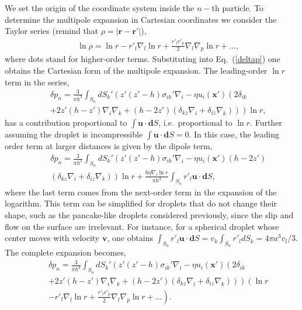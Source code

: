We set the origin of the coordinate system
inside the $n-$th particle. To determine the multipole expansion in Cartesian coordinates we consider the Taylor series (remind that $\rho=|\bm r-\bm r'|$),
\begin{eqnarray}&&\!\!\!\!\!\!
\ln \rho\!=\!\ln r\!-\!r'_l\nabla_l\ln r\!+\!\frac{r'_lr'_p}{2}\nabla_l\nabla_p\ln r\!+\!\ldots,
\end{eqnarray}
where dots stand for higher-order terms. Substituting into Eq.~(\ref{deltap}) one obtains the Cartesian form of the multipole expansion. The  leading-order $\ln r$ term in the series,
\begin{eqnarray}&&\!\!\!\!\!\!
\delta p_n=\frac{3}{\pi h^3}\int_{S_n}dS_k' \left(
z'(z'-h) \sigma_{ik}'\nabla_i-\eta u_{i}(\bm x')\left(
2\delta_{ik}\nonumber\right.\right.\\&&\!\!\!\!\!\!\left.\left.+2z'(h\!-\!z')\nabla_i \nabla_k
+(h\!-\!2z')
\left(\delta_{kz}\nabla_i+\delta_{iz}\nabla_k \right)\right)\right)\ln r,
\end{eqnarray}
has a contribution proportional to $\int \bm u\cdot{\bm dS}$, i.e.\  proportional to $\ln r$. Further assuming the droplet is incompressible $\int \bm u\cdot{\bm dS}=0$.
In this case,  the leading order term at larger distances is given by the dipole term,
\begin{eqnarray}&&\!\!\!\!\!\!
\delta p_n=\frac{3}{\pi h^3}\int_{S_n}dS_k' \left(
z'(z'-h) \sigma_{ik}'\nabla_i-\eta u_{i}(\bm x')(h\!-\!2z')\nonumber\right.\\&&\!\!\!\!\!\!\left.
\left(\delta_{kz}\nabla_i+\delta_{iz}\nabla_k \right)\right)\ln r
+\frac{6\eta\nabla_l\ln r}{\pi h^3}\int_{S_n}r'_l \bm u\cdot{\bm dS}, \label{dpl}
\end{eqnarray}
where the last term comes from the next-order term in the expansion of the logarithm. This term can be simplified for droplets that do not change their shape, such as the pancake-like droplets considered previously, since
the slip and flow on the surface are irrelevant. For instance, for a spherical droplet whose center moves with velocity $\bm v$,  one obtains $\int_{S_n}r'_l \bm u\cdot{\bm dS}=v_k\int_{S_n}r'_l dS_k=4\pi a^3 v_l/3$.
The complete expansion becomes,
\begin{eqnarray}&&\!\!\!\!\!\!\!\!\!
\delta p_n=\frac{3}{\pi h^3}\int_{S_n}dS_k' \left(
z'(z'-h) \sigma_{ik}'\nabla_i-\eta u_{i}(\bm x')\left(
2\delta_{ik}\nonumber\right.\right.\\&&\!\!\!\!\!\!\!\!\!\left.\left.+2z'(h\!-\!z')\nabla_i \nabla_k
+(h\!-\!2z')
\left(\delta_{kz}\nabla_i+\delta_{iz}\nabla_k \right)\right)\right)\left(\ln r\nonumber\right.\\&&\!\!\!\!\!\!\left.
-r'_{l}\nabla_{l}\ln r+\frac{r'_{l}r'_{p}}{2}\nabla_{l}\nabla_{p}\ln r+\ldots
\right).
\end{eqnarray}
